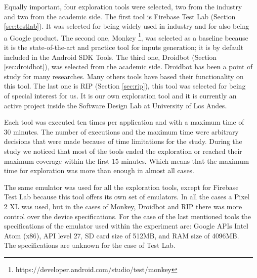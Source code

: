 Equally important, four exploration tools were selected, two from the industry and two from the academic side. The first tool is Firebase Test Lab (Section \ref{sec:testlab}). It was selected for being widely used in industry and for also being a Google product. The second one, Monkey \footnote{https://developer.android.com/studio/test/monkey}, was selected as a baseline because it is the state-of-the-art and practice tool for inputs generation; it is by default included in the Android SDK Tools. The third one, Droidbot (Section \ref{sec:droidbot}), was selected from the academic side. Droidbot has been a point of study for many researches. Many others tools have based their functionality on this tool. The last one is RIP (Section \ref{sec:rip}), this tool was selected for being of special interest for us. It is our own exploration tool and it is currently an active project inside the Software Design Lab at University of Los Andes. 

Each tool was executed ten times per application and with a maximum time of 30 minutes. The number of executions and the maximum time were arbitrary decisions that were made because of time limitations for the study. During the study we noticed that most of the tools ended the exploration or reached their maximum coverage within the first 15 minutes. Which means that the maximum time for exploration was more than enough in almost all cases. 

The same emulator was used for all the exploration tools, except for Firebase Test Lab because this tool offers its own set of emulators. In all the cases a Pixel 2 XL was used, but in the cases of Monkey, Droidbot and RIP there was more control over the device specifications. For the case of the last mentioned tools the specifications of the emulator used within the experiment are:  Google APIs Intel Atom (x86), API level 27, SD card size of 512MB, and RAM size of 4096MB. The specifications are unknown for the case of Test Lab.

